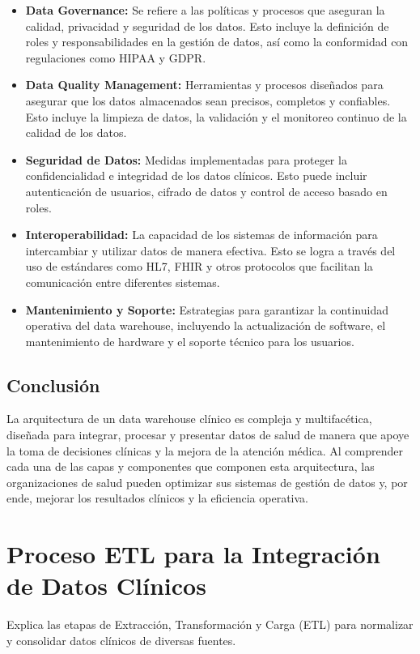 \documentclass[12pt, a4paper, twoside]{article}
\begin{document}
	\begin{itemize}
		\item \textbf{Data Governance:} Se refiere a las políticas y procesos que aseguran la calidad, privacidad y seguridad de los datos. Esto incluye la definición de roles y responsabilidades en la gestión de datos, así como la conformidad con regulaciones como HIPAA y GDPR.
		
		\item \textbf{Data Quality Management:} Herramientas y procesos diseñados para asegurar que los datos almacenados sean precisos, completos y confiables. Esto incluye la limpieza de datos, la validación y el monitoreo continuo de la calidad de los datos.
		
		\item \textbf{Seguridad de Datos:} Medidas implementadas para proteger la confidencialidad e integridad de los datos clínicos. Esto puede incluir autenticación de usuarios, cifrado de datos y control de acceso basado en roles.
		
		\item \textbf{Interoperabilidad:} La capacidad de los sistemas de información para intercambiar y utilizar datos de manera efectiva. Esto se logra a través del uso de estándares como HL7, FHIR y otros protocolos que facilitan la comunicación entre diferentes sistemas.
		
		\item \textbf{Mantenimiento y Soporte:} Estrategias para garantizar la continuidad operativa del data warehouse, incluyendo la actualización de software, el mantenimiento de hardware y el soporte técnico para los usuarios.
	\end{itemize}
	
	\subsection{Conclusión}
	
	La arquitectura de un data warehouse clínico es compleja y multifacética, diseñada para integrar, procesar y presentar datos de salud de manera que apoye la toma de decisiones clínicas y la mejora de la atención médica. Al comprender cada una de las capas y componentes que componen esta arquitectura, las organizaciones de salud pueden optimizar sus sistemas de gestión de datos y, por ende, mejorar los resultados clínicos y la eficiencia operativa.
	
	
	\section{Proceso ETL para la Integración de Datos Clínicos}
	Explica las etapas de Extracción, Transformación y Carga (ETL) para normalizar y consolidar datos clínicos de diversas fuentes.
	
\end{document}
